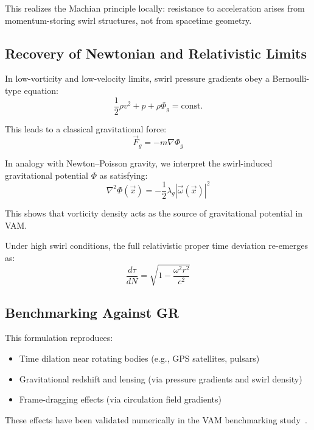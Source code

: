 \documentclass[12pt]{article}
\begin{document}
    This realizes the Machian principle locally: resistance to acceleration arises from momentum-storing swirl structures, not from spacetime geometry.

    \subsection{Recovery of Newtonian and Relativistic Limits}

    In low-vorticity and low-velocity limits, swirl pressure gradients obey a Bernoulli-type equation:
    \begin{equation}
        \frac{1}{2} \rho v^2 + p + \rho \Phi_g = \text{const.}
        \label{eq:bernoulli_grav}
    \end{equation}

    This leads to a classical gravitational force:
    \begin{equation}
        \vec{F}_g = -m \nabla \Phi_g
        \label{eq:newtonian_grav_force}
    \end{equation}

    In analogy with Newton–Poisson gravity, we interpret the swirl-induced gravitational potential \( \Phi \) as satisfying:
    \begin{equation}
        \nabla^2 \Phi(\vec{x}) = - \frac{1}{2} \lambda_g |\vec{\omega}(\vec{x})|^2
        \label{eq:swirl_poisson}
    \end{equation}

    This shows that vorticity density acts as the source of gravitational potential in VAM.

    Under high swirl conditions, the full relativistic proper time deviation re-emerges as:
    \begin{equation}
        \frac{d\tau}{dN} = \sqrt{1 - \frac{\omega^2 r^2}{c^2}}
        \label{eq:general_swirl_time}
    \end{equation}

    \subsection{Benchmarking Against GR}

    This formulation reproduces:
    \begin{itemize}
        \item Time dilation near rotating bodies (e.g., GPS satellites, pulsars)
        \item Gravitational redshift and lensing (via pressure gradients and swirl density)
        \item Frame-dragging effects (via circulation field gradients)
    \end{itemize}
    These effects have been validated numerically in the VAM benchmarking study~\cite{vam_benchmark2025}.
\end{document}
